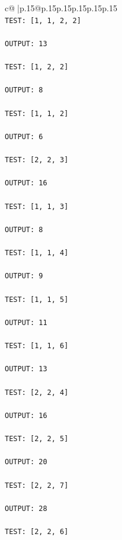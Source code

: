 \documentclass{article}
\begin{document}
{\begin{supertabular}{c@{$\;$}|p{.15\linewidth}@{}p{.15\linewidth}p{.15\linewidth}p{.15\linewidth}p{.15\linewidth}p{.15\linewidth}}
{{{\\ 
\texttt{TEST: {[}1, 1, 2, 2{]}} \\
\\ 
\texttt{OUTPUT: 13} \\
\\ 
\texttt{TEST: {[}1, 2, 2{]}} \\
\\ 
\texttt{OUTPUT: 8} \\
\\ 
\texttt{TEST: {[}1, 1, 2{]}} \\
\\ 
\texttt{OUTPUT: 6} \\
\\ 
\texttt{TEST: {[}2, 2, 3{]}} \\
\\ 
\texttt{OUTPUT: 16} \\
\\ 
\texttt{TEST: {[}1, 1, 3{]}} \\
\\ 
\texttt{OUTPUT: 8} \\
\\ 
\texttt{TEST: {[}1, 1, 4{]}} \\
\\ 
\texttt{OUTPUT: 9} \\
\\ 
\texttt{TEST: {[}1, 1, 5{]}} \\
\\ 
\texttt{OUTPUT: 11} \\
\\ 
\texttt{TEST: {[}1, 1, 6{]}} \\
\\ 
\texttt{OUTPUT: 13} \\
\\ 
\texttt{TEST: {[}2, 2, 4{]}} \\
\\ 
\texttt{OUTPUT: 16} \\
\\ 
\texttt{TEST: {[}2, 2, 5{]}} \\
\\ 
\texttt{OUTPUT: 20} \\
\\ 
\texttt{TEST: {[}2, 2, 7{]}} \\
\\ 
\texttt{OUTPUT: 28} \\
\\ 
\texttt{TEST: {[}2, 2, 6{]}} \\
\\ 
}}}
\end{supertabular}}
\end{document}
